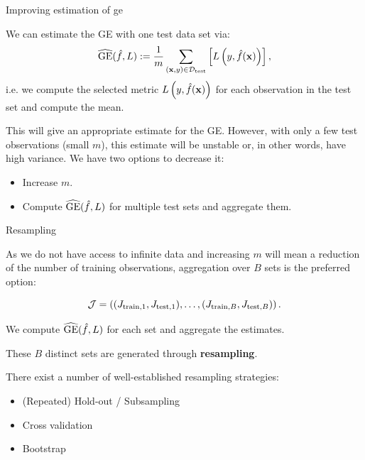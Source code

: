 \documentclass[11pt,compress,t,notes=noshow, xcolor=table]{beamer}
\begin{document}
\begin{vbframe}{Improving estimation of ge}

We can estimate the GE with one test data set via:  $$\widehat{\mathrm{GE}}(\hat{f}, L) := \frac{1}{m}\sum_{(\mathbf{x}, y) \in \mathcal{D}_{\text{test}}} \left[ L\left(y, \hat{f}(\mathbf{x})\right) \right],$$ 
i.e. we compute the selected metric $L\left(y, \hat{f}(\mathbf{x})\right)$ for each observation in the test set and compute the mean.

\vspace{0.2cm}
This will give an appropriate estimate for the GE.
However, with only a few test observations (small $m$), this estimate will be unstable or, in other words, have high variance.
We have two options to decrease it:

\begin{itemize}
\item Increase $m$.
\item Compute $\widehat{\mathrm{GE}}(\hat{f}, L)$ for multiple test sets and aggregate them.
\end{itemize}

\end{vbframe}

\begin{vbframe}{Resampling}

As we do not have access to infinite data and increasing $m$ will mean a reduction of the number of training observations, aggregation over $B$ sets is the preferred option:

$$\mathcal{J} = \left((J_{\mathrm{train},1}, J_{\mathrm{test},1}),\dots,(J_{\mathrm{train},B}, J_{\mathrm{test},B})\right).$$

We compute $\widehat{\mathrm{GE}}(\hat{f}, L)$ for each set and aggregate the estimates.

These $B$ distinct sets are generated through \textbf{resampling}.

\vspace{0.2cm}

There exist a number of well-established resampling strategies:

\begin{itemize}
\item (Repeated) Hold-out / Subsampling
\item Cross validation
\item Bootstrap
\end{itemize}

\end{vbframe}
\end{document}
